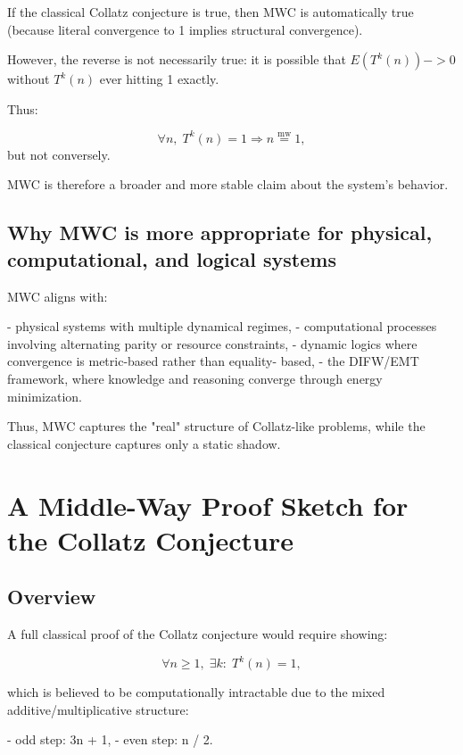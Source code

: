 \documentclass[11pt]{article}
\newcommand{\mweq}{\mathrel{\overset{\mathrm{mw}}{=}}}
\theoremstyle{definition}
\theoremstyle{remark}
\begin{document}
If the classical Collatz conjecture is true, then MWC is automatically
true (because literal convergence to 1 implies structural convergence).

However, the reverse is not necessarily true:  
it is possible that $E(T^k(n)) -> 0$ without $T^k(n)$ ever hitting 1
exactly.

Thus:

\[
  \forall n,\; T^k(n) = 1 \Rightarrow n \mweq 1,
\]
but not conversely.

MWC is therefore a broader and more stable claim about the system's
behavior.

\subsection{Why MWC is more appropriate for physical, computational,
and logical systems}

MWC aligns with:

- physical systems with multiple dynamical regimes,
- computational processes involving alternating parity or resource
  constraints,
- dynamic logics where convergence is metric-based rather than equality-
  based,
- the DIFW/EMT framework, where knowledge and reasoning converge through
  energy minimization.

Thus, MWC captures the "real" structure of Collatz-like problems, while
the classical conjecture captures only a static shadow.


\section{A Middle-Way Proof Sketch for the Collatz Conjecture}

\subsection{Overview}

A full classical proof of the Collatz conjecture would require showing:

\[
  \forall n \ge 1,\; \exists k:\; T^{k}(n)=1,
\]

which is believed to be computationally intractable due to the mixed
additive/multiplicative structure:

- odd step: 3n + 1,
- even step: n / 2.
\end{document}
